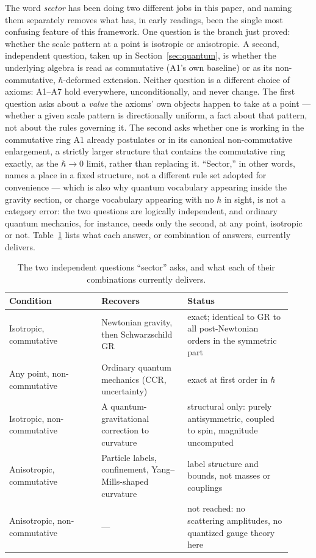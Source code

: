 \documentclass[aps,prd,twocolumn,superscriptaddress,nofootinbib]{revtex4-2}
\begin{document}
The word \emph{sector} has been doing two different jobs in this paper,
and naming them separately removes what has, in early readings, been the
single most confusing feature of this framework. One question is the
branch just proved: whether the scale pattern at a point is isotropic or
anisotropic. A second, independent question, taken up in
Section~\ref{sec:quantum}, is whether the underlying algebra is read as
commutative (A1's own baseline) or as its non-commutative,
$\hbar$-deformed extension. Neither question is a different choice of
axioms: A1–A7 hold everywhere, unconditionally, and never change. The
first question asks about a \emph{value} the axioms' own objects happen
to take at a point — whether a given scale pattern is directionally
uniform, a fact about that pattern, not about the rules governing it. The
second asks whether one is working in the commutative ring A1 already
postulates or in its canonical non-commutative enlargement, a strictly
larger structure that contains the commutative ring exactly, as the
$\hbar\to0$ limit, rather than replacing it. ``Sector,'' in other words,
names a place in a fixed structure, not a different rule set adopted for
convenience — which is also why quantum vocabulary appearing inside the
gravity section, or charge vocabulary appearing with no $\hbar$ in sight,
is not a category error: the two questions are logically independent, and
ordinary quantum mechanics, for instance, needs only the second, at any
point, isotropic or not. Table~\ref{tab:sectors} lists what each answer,
or combination of answers, currently delivers.

\begin{table}[h]
\centering
\small
\begin{tabular}{p{0.30\linewidth}p{0.28\linewidth}p{0.34\linewidth}}
\toprule
Condition & Recovers & Status \\
\midrule
Isotropic, commutative & Newtonian gravity, then Schwarzschild GR & exact; identical to GR to all post-Newtonian orders in the symmetric part \\
Any point, non-commutative & Ordinary quantum mechanics (CCR, uncertainty) & exact at first order in $\hbar$ \\
Isotropic, non-commutative & A quantum-gravitational correction to curvature & structural only: purely antisymmetric, coupled to spin, magnitude uncomputed \\
Anisotropic, commutative & Particle labels, confinement, Yang--Mills-shaped curvature & label structure and bounds, not masses or couplings \\
Anisotropic, non-commutative & --- & not reached: no scattering amplitudes, no quantized gauge theory here \\
\bottomrule
\end{tabular}
\caption{The two independent questions ``sector'' asks, and what each of
their combinations currently delivers.}
\label{tab:sectors}
\end{table}
\FloatBarrier
\end{document}
